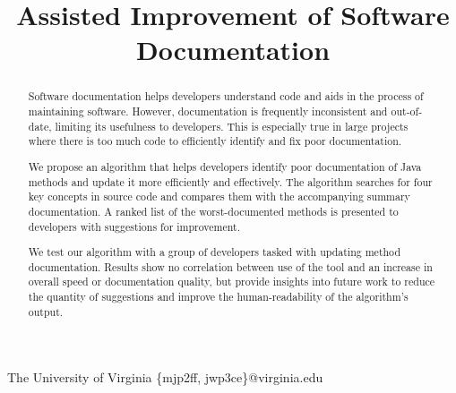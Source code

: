 \documentclass[preprint]{sigplanconf}
\begin{document}
\setlength{\pdfpageheight}{\paperheight}
\setlength{\pdfpagewidth}{\paperwidth}





\title{Assisted Improvement of Software Documentation}

           {The University of Virginia}
           {\{mjp2ff, jwp3ce\}@virginia.edu}
           
\maketitle

\begin{abstract}
Software documentation helps developers understand code and aids in the process of maintaining software. However, documentation is frequently inconsistent and out-of-date, limiting its usefulness to developers. This is especially true in large projects where there is too much code to efficiently identify and fix poor documentation.

We propose an algorithm that helps developers identify poor documentation of Java methods and update it more efficiently and effectively. The algorithm searches for four key concepts in source code and compares them with the accompanying summary documentation. A ranked list of the worst-documented methods is presented to developers with suggestions for improvement.

We test our algorithm with a group of developers tasked with updating method documentation. Results show no correlation between use of the tool and an increase in overall speed or documentation quality, but provide insights into future work to reduce the quantity of suggestions and improve the human-readability of the algorithm's output.
\end{abstract}
\end{document}
